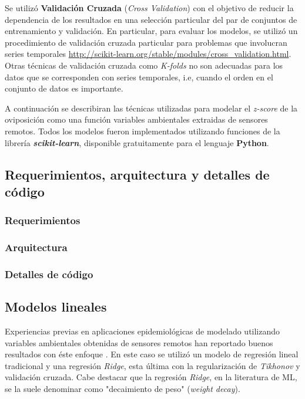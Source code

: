   \par Se utilizó \textbf{Validación Cruzada}
    (\textit{Cross Validation}) \cite{cross_validation, ml_rainfall} con el
    objetivo de reducir la dependencia de los resultados en una selección particular
    del par de conjuntos de entrenamiento y validación. En particular, para
    evaluar los modelos, se utilizó un procedimiento de validación cruzada
    particular para problemas que involucran series temporales
    \url{http://scikit-learn.org/stable/modules/cross_validation.html}.
    Otras técnicas de validación cruzada como \textit{K-folds} no son
    adecuadas para los datos que se corresponden con series temporales, i.e,
    cuando el orden en el conjunto de datos es importante.

    \par A continuación se describiran las técnicas utilizadas para modelar
    el \textit{z-score} de la oviposición como una función variables ambientales
    extraidas de sensores remotos. Todos los modelos fueron implementados utilizando
    funciones de la librería \textbf{\textit{scikit-learn}}, disponible
    gratuitamente para el lenguaje \textbf{Python}.


    \subsection{Requerimientos, arquitectura y detalles de código}

      \subsubsection{Requerimientos}

      \subsubsection{Arquitectura}

      \subsubsection{Detalles de código}
    

    \subsection{Modelos lineales}

      \par Experiencias previas en aplicaciones epidemiológicas de
        modelado utilizando variables ambientales obtenidas de sensores
        remotos han reportado buenos resultados con éste
        enfoque \cite{akodon_modeling, multilinear_apli, modis_data}.
        En este caso se utilizó un modelo de regresión lineal tradicional y
        una regresión \textit{Ridge}, esta última con la regularización de
        \textit{Tikhonov} y validación cruzada. Cabe destacar que la
        regresión \textit{Ridge}, en la literatura de ML, se la suele denominar
        como "decaimiento de peso" (\textit{weight decay}).

